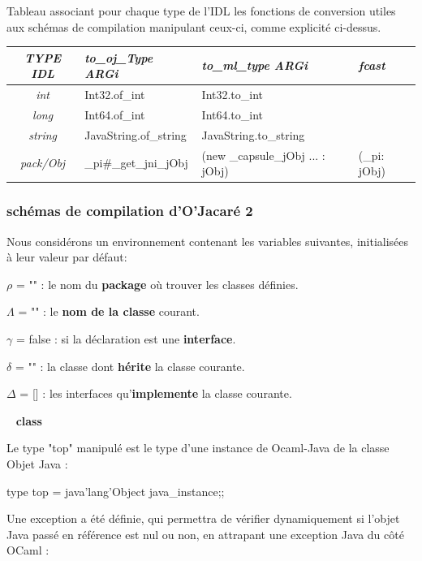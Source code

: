 \documentclass[a4paper, 11pt]{article}
\begin{document}
Tableau associant pour chaque type de l'IDL les
fonctions de conversion utiles aux schémas de compilation manipulant ceux-ci, comme explicité ci-dessus. 

\begin{tabular}{|c|l|l|l|}
  \hline
  \emph{TYPE IDL} & \emph{to\_oj\_Type ARGi} & \emph{to\_ml\_type ARGi} & \emph{fcast}\\
  \hline

 \emph{int} & Int32.of\_int\ & Int32.to\_int & \\
 \emph{long} & Int64.of\_int & Int64.to\_int & \\
 
 \emph{string} & JavaString.of\_string & JavaString.to\_string & \\
 \emph{pack/Obj} & \_pi\#\_get\_jni\_jObj & (new \_capsule\_jObj ... : jObj) & (\_pi: jObj)\\
  \hline
\end{tabular}


\subsubsection{schémas de compilation d'O'Jacaré 2}

\noindent
Nous considérons un environnement contenant les  variables suivantes, initialisées à leur valeur par défaut: 

$\rho$ = "" : le nom du \textbf{package} où trouver les classes définies.

$\Lambda$ = "" : le \textbf{nom de la classe} courant.

$\gamma$ = false : si la déclaration est une \textbf{interface}.

$\delta$ = "" : la classe dont \textbf{hérite} la classe courante.

$\Delta$ = [] : les interfaces qu'\textbf{implemente} la classe courante.
\ %


\ 
\newline
\textbf{class}

Le type "top" manipulé est le type d'une instance de Ocaml-Java de la classe Objet Java :
\begin{OCamlEx}
type top = java'lang'Object java_instance;;
\end{OCamlEx}

Une exception a été définie, qui permettra de vérifier dynamiquement si l'objet Java passé en référence est nul ou non, en attrapant une exception Java du côté OCaml : 
\end{document}
